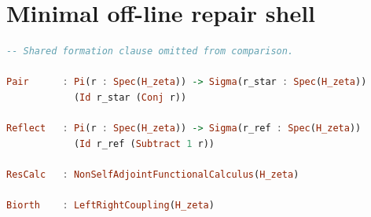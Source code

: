 \documentclass[11pt,a4paper]{article}
\theoremstyle{plain}
\theoremstyle{definition}
\begin{document}
\section{Minimal off-line repair shell}

\begin{lstlisting}[language=Haskell,caption={Minimal off-line repair clauses.},label={lst:nh}]
-- Shared formation clause omitted from comparison.

Pair      : Pi(r : Spec(H_zeta)) -> Sigma(r_star : Spec(H_zeta))
            (Id r_star (Conj r))

Reflect   : Pi(r : Spec(H_zeta)) -> Sigma(r_ref : Spec(H_zeta))
            (Id r_ref (Subtract 1 r))

ResCalc   : NonSelfAdjointFunctionalCalculus(H_zeta)

Biorth    : LeftRightCoupling(H_zeta)
\end{lstlisting}



\end{document}

